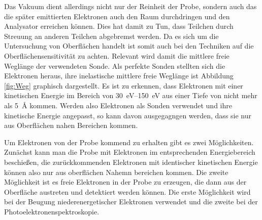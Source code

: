         Das Vakuum dient allerdings nicht nur der Reinheit der Probe, sondern auch das die später emittierten Elektronen auch den Raum durchdringen und den Analysator erreichen können.
        Dies hat damit zu Tun, dass Teilchen durch Streuung an anderen Teilchen abgebremst werden.
        Da es sich um die Untersuchung von Oberflächen handelt ist somit auch bei den Techniken auf die Oberflächensensitivität zu achten.
        Relevant wird damit die mittlere freie Weglänge der verwendeten Sonde.
        Als perfekte Sonden stellten sich die Elektronen heraus, ihre inelastische mittlere freie Weglänge ist Abbildung \ref{fig:Weg} graphisch dargestellt.
        Es ist zu erkennen, dass Elektronen mit einer kinetischen Energie im Bereich von \SIrange{30}{150}{\electronvolt} aus einer Tiefe von nicht mehr als \SI{5}{\angstrom} kommen.
        Werden also Elektronen als Sonden verwendet und ihre kinetische Energie angepasst, so kann davon ausgegagngen werden, dass sie nur aus Oberflächen nahen Bereichen kommen.

        Um Elektronen von der Probe kommend zu erhalten gibt es zwei Möglichkeiten.
        Zunächst kann man die Probe mit Elektronen im entsprechenden Energiebereich beschießen, die zurückkommenden Elektronen mit identischer kinetischen Energie können also nur aus oberflächen Nahemn bereichen kommen.
        Die zweite Möglichkeit ist es freie Elektronen in der Probe zu erzeugen, die dann aus der Oberfläche austreten und detektiert werden können.
        Die erste Möglichkeit wird bei der Beugung niederenergetischer Elektronen verwendet und die zweite bei der Photoelektronenspektroskopie.


